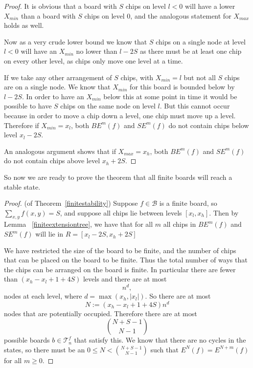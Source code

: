 \documentclass[11pt]{article}
\begin{document}
\begin{proof}
It is obvious that a board with $S$ chips on level $l<0$ will have a lower $X_{min}$ than a board with $S$ chips on level 0, and the analogous statement for $X_{max}$ holds as well. 

Now as a very crude lower bound we know that $S$ chips on a single node at level $l<0$ will have an $X_{min}$ no lower than $l-2S$ as there must be at least one chip on every other level, as chips only move one level at a time. 

If we take any other arrangement of $S$ chips, with $X_{min}=l$ but not all $S$ chips are on a single node. We know that $X_{min}$ for this board is bounded below by $l-2S$. In order to have an $X_{min}$ below this at some point in time it would be possible to have $S$ chips on the same node on level $l$. But this cannot occur because in order to move a chip down a level, one chip must move up a level. Therefore if $X_{min}=x_l$, both $BE^m(f)$ and $SE^m(f)$ do not contain chips below level $x_l -2S$.

An analogous argument shows that if $X_{max}=x_h$, both $BE^m(f)$ and $SE^m(f)$ do not contain chips above level $x_h+2S$.
\end{proof}

So now we are ready to prove the theorem that all finite boards will reach a stable state. 

\begin{proof}
(of Theorem~\ref{finitestability}) Suppose $f \in \mathcal{B}$ is a finite board, so $\sum_{x,y} f(x,y) = S$, and suppose all chips lie between levels  $[x_l, x_h]$. Then by Lemma ~\ref{finiteextensiontree}, we have that for all $m$ all chips in $BE^m(f)$ and $SE^m(f)$ will lie in $R = [x_l - 2S, x_h + 2S]$

We have restricted the size of the board to be finite, and the number of chips that can be placed on the board to be finite. 
Thus the total number of ways that the chips can be arranged on the board is finite. 
In particular there are fewer than $(x_h - x_l+1 + 4 S)$ levels and there are at most 
\begin{equation}
n^d,
\end{equation}
nodes at each level, where $d= \max(x_h, |x_l|)$. So there are at most 
\begin{equation}
N:=(x_h - x_l+1 + 4 S)n^d
\end{equation}
nodes that are potentially occupied. Therefore there are at most 
\begin{equation}
\binom{N+S-1}{N-1}
\end{equation}
possible boards $b \in \mathcal{T}_n^f$ that satisfy this. We know that there are no cycles in the states, so there must be an $0 \leq N < \binom{N+S-1}{N-1}$ such that $E^N(f) = E^{N+m}(f)$ for all $m \geq 0$.
\end{proof}
\end{document}
